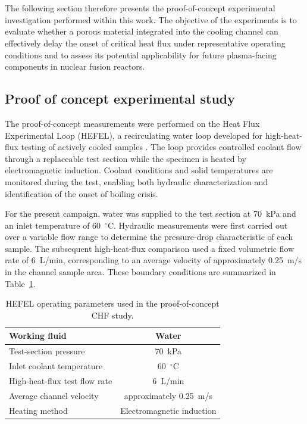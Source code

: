 \documentclass[a4paper]{article}
\begin{document}
\\
\\
The following section therefore presents the proof-of-concept experimental investigation performed within this work. The objective of the experiments is to evaluate whether a porous material integrated into the cooling channel can effectively delay the onset of critical heat flux under representative operating conditions and to assess its potential applicability for future plasma-facing components in nuclear fusion reactors.

\pagebreak
\subsection{Proof of concept experimental study}
The proof-of-concept measurements were performed on the Heat Flux Experimental Loop (HEFEL), a recirculating water loop developed for high-heat-flux testing of actively cooled samples . The loop provides controlled coolant flow through a replaceable test section while the specimen is heated by electromagnetic induction. Coolant conditions and solid temperatures are monitored during the test, enabling both hydraulic characterization and identification of the onset of boiling crisis.

For the present campaign, water was supplied to the test section at 70~kPa and an inlet temperature of 60~$^\circ$C. Hydraulic measurements were first carried out over a variable flow range to determine the pressure-drop characteristic of each sample. The subsequent high-heat-flux comparison used a fixed volumetric flow rate of 6~L/min, corresponding to an average velocity of approximately 0.25~m/s in the channel sample area. These boundary conditions are summarized in Table~\ref{tab:hefel_parameters}.

\begin{table}[ht!]
\centering
\begin{tabular}{|l|c|}
\hline
Working fluid & Water \\
\hline
Test-section pressure & 70~kPa \\
\hline
Inlet coolant temperature & 60~$^\circ$C \\
\hline
High-heat-flux test flow rate & 6~L/min \\
\hline
Average channel velocity & approximately 0.25~m/s \\
\hline
Heating method & Electromagnetic induction \\
\hline
\end{tabular}
\caption{HEFEL operating parameters used in the proof-of-concept CHF study.}
\label{tab:hefel_parameters}
\end{table}
\end{document}
